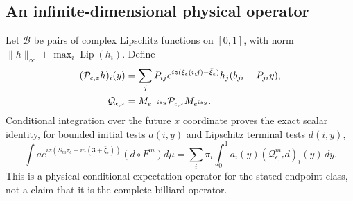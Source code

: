 \subsection{An infinite-dimensional physical operator}
Let $\mathcal B$ be pairs of complex Lipschitz functions on $[0,1]$,
with norm $\|h\|_\infty+\max_i\operatorname{Lip}(h_i)$. Define
\begin{align}
 (\mathcal P_{\epsilon,z}h)_i(y)
 &=\sum_j P_{ij}e^{iz(\xi_\epsilon(i,j)-\bar\xi_\epsilon)}
                       h_j(b_{ji}+P_{ji}y),\notag\\
 \mathcal Q_{\epsilon,z}
 &=M_{e^{-izy}}\mathcal P_{\epsilon,z}M_{e^{izy}}.
                                             \label{eq:v59-markov-operator}
\end{align}
Conditional integration over the future $x$ coordinate proves the
exact scalar identity, for bounded initial tests $a(i,y)$ and
Lipschitz terminal tests $d(i,y)$,
\begin{equation}\label{eq:v59-physical-pairing}
 \int a e^{iz(S_m\tau_\epsilon-m(3+\bar\xi_\epsilon))}
                 (d\circ F^m)d\mu
       =\sum_i\pi_i\int_0^1a_i(y)(\mathcal Q_{\epsilon,z}^md)_i(y)\,dy.
\end{equation}
This is a physical conditional-expectation operator for the stated
endpoint class, not a claim that it is the complete billiard operator.

